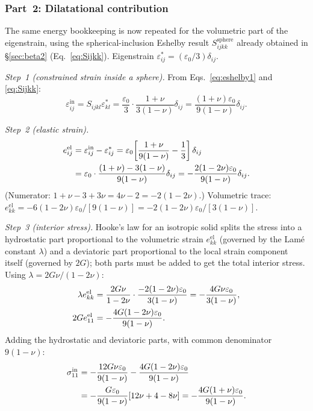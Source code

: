 \documentclass[5p,sort&compress]{elsarticle}
\begin{document}
\subsubsection{Part~2: Dilatational contribution}
\label{sec:Edilat}

The same energy bookkeeping is now repeated for the volumetric part
of the eigenstrain, using the spherical-inclusion Eshelby result
$S_{ijkk}^\text{sphere}$ already obtained in
\S\ref{sec:beta2} (Eq.~\eqref{eq:Sijkk}).
Eigenstrain $\varepsilon^*_{ij}=(\varepsilon_0/3)\delta_{ij}$.

\textit{Step~1 (constrained strain inside a sphere).}
From Eqs.~\eqref{eq:eshelby1} and \eqref{eq:Sijkk}:
\begin{equation}
  \varepsilon_{ij}^\mathrm{in}=S_{ijkl}\varepsilon^*_{kl}
  =\frac{\varepsilon_0}{3}\cdot\frac{1+\nu}{3(1-\nu)}\delta_{ij}
  =\frac{(1+\nu)\varepsilon_0}{9(1-\nu)}\delta_{ij}.
  \label{eq:constrained_dil}
\end{equation}

\textit{Step~2 (elastic strain).}
\begin{align}
  e_{ij}^\mathrm{el}&=\varepsilon_{ij}^\mathrm{in}-\varepsilon^*_{ij}
    =\varepsilon_0\!\left[\frac{1+\nu}{9(1-\nu)}-\frac{1}{3}\right]\delta_{ij}
    \notag\\
  &=\varepsilon_0\cdot\frac{(1+\nu)-3(1-\nu)}{9(1-\nu)}\delta_{ij}
    =-\frac{2(1-2\nu)\varepsilon_0}{9(1-\nu)}\delta_{ij}.
    \label{eq:edilelastic}
\end{align}
(Numerator: $1+\nu-3+3\nu=4\nu-2=-2(1-2\nu)$.)
Volumetric trace:
$e_{kk}^\mathrm{el}=-6(1-2\nu)\varepsilon_0/[9(1-\nu)]
=-2(1-2\nu)\varepsilon_0/[3(1-\nu)]$.

\textit{Step~3 (interior stress).}
Hooke's law for an isotropic solid splits the stress into a
hydrostatic part proportional to the volumetric strain $e_{kk}^\mathrm{el}$
(governed by the Lamé constant $\lambda$) and a deviatoric part
proportional to the local strain component itself (governed by
$2G$); both parts must be added to get the total interior stress.
Using $\lambda=2G\nu/(1-2\nu)$:
\begin{align}
  \lambda e_{kk}^\mathrm{el}
    &=\frac{2G\nu}{1-2\nu}\cdot\frac{-2(1-2\nu)\varepsilon_0}{3(1-\nu)}
    =-\frac{4G\nu\varepsilon_0}{3(1-\nu)},\notag\\
  2Ge_{11}^\mathrm{el}
    &=-\frac{4G(1-2\nu)\varepsilon_0}{9(1-\nu)}.
    \notag
\end{align}
Adding the hydrostatic and deviatoric parts, with common denominator
$9(1-\nu)$:
\begin{align}
  \sigma_{11}^\mathrm{in}&=-\frac{12G\nu\varepsilon_0}{9(1-\nu)}
    -\frac{4G(1-2\nu)\varepsilon_0}{9(1-\nu)}\notag\\
  &=-\frac{G\varepsilon_0}{9(1-\nu)}[12\nu+4-8\nu]
    =-\frac{4G(1+\nu)\varepsilon_0}{9(1-\nu)}.
    \label{eq:sig11in}
\end{align}
\end{document}
